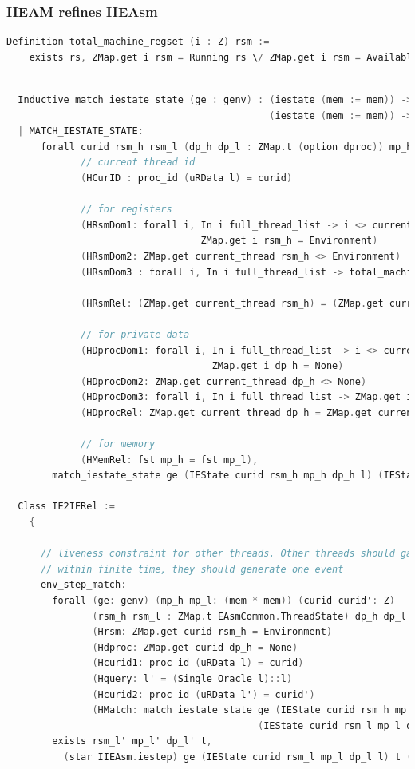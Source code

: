 \subsubsection{IIEAM refines IIEAsm}

\begin{lstlisting}[language=C]
  Definition total_machine_regset (i : Z) rsm :=
    exists rs, ZMap.get i rsm = Running rs \/ ZMap.get i rsm = Available.  
\end{lstlisting}


\begin{lstlisting}[language=C]

  Inductive match_iestate_state (ge : genv) : (iestate (mem := mem)) -> 
                                              (iestate (mem := mem)) -> Prop :=  
  | MATCH_IESTATE_STATE:
      forall curid rsm_h rsm_l (dp_h dp_l : ZMap.t (option dproc)) mp_h mp_l l
             // current thread id
             (HCurID : proc_id (uRData l) = curid)

             // for registers 
             (HRsmDom1: forall i, In i full_thread_list -> i <> current_thread ->
                                  ZMap.get i rsm_h = Environment)
             (HRsmDom2: ZMap.get current_thread rsm_h <> Environment)
             (HRsmDom3 : forall i, In i full_thread_list -> total_machine_regset i rsm_l)
             
             (HRsmRel: (ZMap.get current_thread rsm_h) = (ZMap.get current_thread rsm_l))
             
             // for private data 
             (HDprocDom1: forall i, In i full_thread_list -> i <> current_thread ->
                                    ZMap.get i dp_h = None)
             (HDprocDom2: ZMap.get current_thread dp_h <> None)
             (HDprocDom3: forall i, In i full_thread_list -> ZMap.get i dp_l <> None)
             (HDprocRel: ZMap.get current_thread dp_h = ZMap.get current_thread dp_l)

             // for memory 
             (HMemRel: fst mp_h = fst mp_l),
        match_iestate_state ge (IEState curid rsm_h mp_h dp_h l) (IEState curid rsm_l mp_l dp_l l).

  Class IE2IERel :=
    {

      // liveness constraint for other threads. Other threads should gaurantee this property -
      // within finite time, they should generate one event 
      env_step_match:
        forall (ge: genv) (mp_h mp_l: (mem * mem)) (curid curid': Z)
               (rsm_h rsm_l : ZMap.t EAsmCommon.ThreadState) dp_h dp_l (l l' : Log)
               (Hrsm: ZMap.get curid rsm_h = Environment)
               (Hdproc: ZMap.get curid dp_h = None)
               (Hcurid1: proc_id (uRData l) = curid)
               (Hquery: l' = (Single_Oracle l)::l)
               (Hcurid2: proc_id (uRData l') = curid')
               (HMatch: match_iestate_state ge (IEState curid rsm_h mp_h dp_h l) 
                                            (IEState curid rsm_l mp_l dp_l l)),
        exists rsm_l' mp_l' dp_l' t,
          (star IIEAsm.iestep) ge (IEState curid rsm_l mp_l dp_l l) t (IEState curid' rsm_l' mp_l' dp_l' l');



\end{lstlisting}
